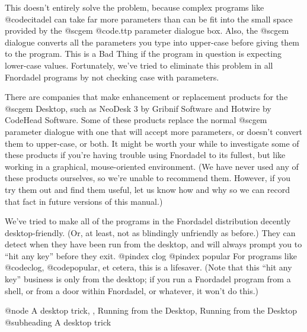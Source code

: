 This doesn't entirely solve the problem, because complex programs
like @code{citadel} can take far more parameters than can be fit into the small
space provided by the @sc{gem} @code{.ttp} parameter dialogue box.  Also,
the @sc{gem} dialogue
converts all the parameters you type into upper-case before giving them to the
program.  This is a Bad Thing if the program in question is expecting
lower-case values.  Fortunately, we've tried to eliminate this problem in all
Fnordadel programs by not checking case with parameters.

There are companies that make enhancement or replacement products for
the @sc{gem} Desktop, such as NeoDesk 3 by Gribnif Software and Hotwire by CodeHead
Software.  Some of these products replace the normal @sc{gem} parameter dialogue
with one that will accept more parameters, or doesn't convert them to
upper-case, or both.  It might be worth your while to investigate some of these
products if you're having trouble using Fnordadel to its fullest, but like
working in a graphical, mouse-oriented environment.  (We have never used any
of these products ourselves, so we're unable to recommend them.  However, if
you try them out and find them useful, let us know how and why so we can record
that fact in future versions of this manual.)

We've tried to make all of the programs in the Fnordadel
distribution decently desktop-friendly.  (Or, at least, not as blindingly
unfriendly as before.)  They can detect when they have been run from the
desktop, and will always prompt you to ``hit any key'' before they exit.
@pindex clog
@pindex popular
For programs like @code{clog}, @code{popular}, et cetera, this is a lifesaver.
(Note that this ``hit any key'' business is only from the desktop; if you
run a Fnordadel program from a shell, or from a door within Fnordadel,
or whatever, it won't do this.)

@node A desktop trick,  , Running from the Desktop, Running from the Desktop
@subheading A desktop trick

